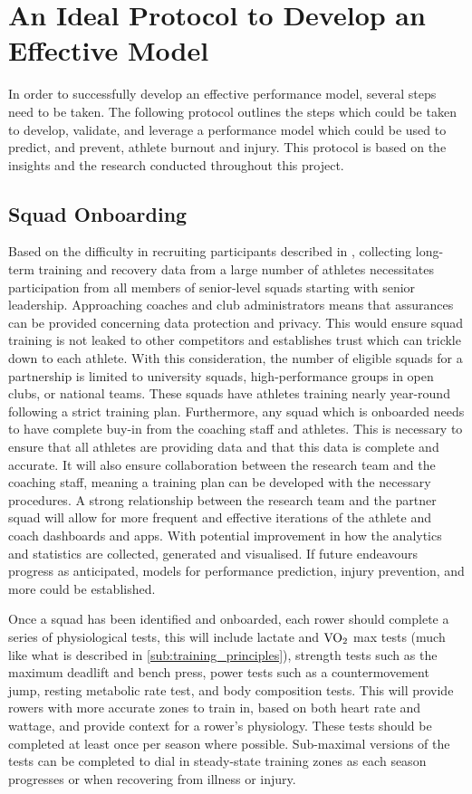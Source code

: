 \section{\label{sec:model-devel-prot}An Ideal Protocol to Develop an Effective Model}
In order to successfully develop an effective performance model, several steps need to be taken. The following protocol outlines the steps which could be taken to develop, validate, and leverage a performance model which could be used to predict, and prevent, athlete burnout and injury. This protocol is based on the insights and the research conducted throughout this project.

\subsection{\label{sub:ideal-onboard}Squad Onboarding}
Based on the difficulty in recruiting participants described in , collecting long-term training and recovery data from a large number of athletes necessitates participation from all members of senior-level squads starting with senior leadership. Approaching coaches and club administrators means that assurances can be provided concerning data protection and privacy. This would ensure squad training is not leaked to other competitors and establishes trust which can trickle down to each athlete. With this consideration, the number of eligible squads for a partnership is limited to university squads, high-performance groups in open clubs, or national teams. These squads have athletes training nearly year-round following a strict training plan. Furthermore, any squad which is onboarded needs to have complete buy-in from the coaching staff and athletes. This is necessary to ensure that all athletes are providing data and that this data is complete and accurate. It will also ensure collaboration between the research team and the coaching staff, meaning a training plan can be developed with the necessary procedures. A strong relationship between the research team and the partner squad will allow for more frequent and effective iterations of the athlete and coach dashboards and apps. With potential improvement in how the analytics and statistics are collected, generated and visualised. If future endeavours progress as anticipated, models for performance prediction, injury prevention, and more could be established.

Once a squad has been identified and onboarded, each rower should complete a series of physiological tests, this will include lactate and $\textnormal{VO}_2$ max tests (much like what is described in \autoref{sub:training_principles}), strength tests such as the maximum deadlift and bench press, power tests such as a countermovement jump, resting metabolic rate test, and body composition tests. This will provide rowers with more accurate zones to train in, based on both heart rate and wattage, and provide context for a rower's physiology. These tests should be completed at least once per season where possible. Sub-maximal versions of the tests can be completed to dial in steady-state training zones as each season progresses or when recovering from illness or injury.

